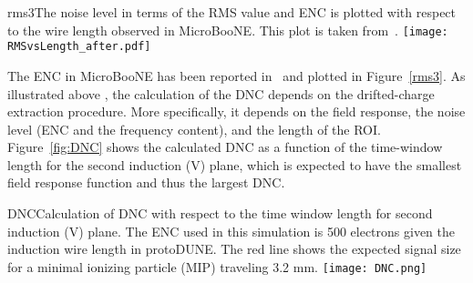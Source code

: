 \begin{cdrfigure}{rms3}{The noise level in terms of the RMS value and ENC 
is plotted with respect to the wire length observed in MicroBooNE. 
This plot is taken from~\cite{noise_filter}.}
\texttt{[image: RMSvsLength\_after.pdf]}
\end{cdrfigure}

The ENC in MicroBooNE has been reported in~\cite{noise_filter} and plotted 
in Figure~\ref{rms3}. As illustrated above , the calculation of the DNC depends on the 
drifted-charge extraction procedure. More specifically, it depends on the field 
response, the noise level (ENC and the frequency content), and the length of the ROI. 
Figure~\ref{fig:DNC} shows the calculated DNC as a function of the time-window length 
for the second induction (V) plane, which is expected to have the smallest field 
response function  and thus the largest DNC. 

\begin{cdrfigure}{DNC}{Calculation of DNC with respect to the time window length for second induction (V) plane. 
The ENC used in this simulation is 500 electrons given the induction wire length in protoDUNE. 
The red line shows the expected signal size for a minimal ionizing particle (MIP) 
traveling 3.2 mm.}
\texttt{[image: DNC.png]}
\end{cdrfigure}


